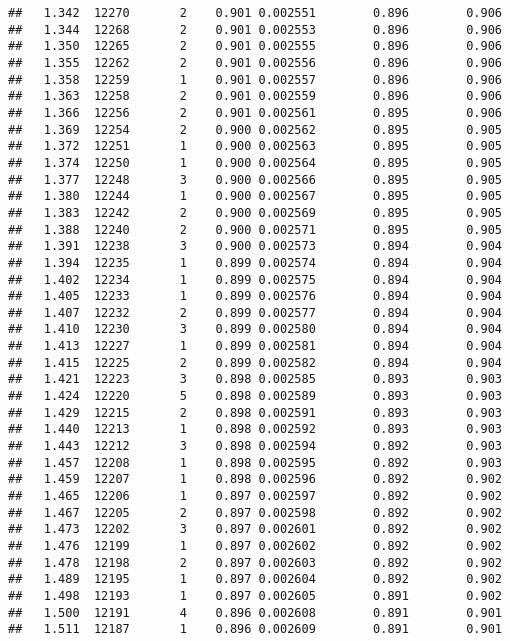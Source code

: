 \documentclass[
]{book}
\begin{document}
\begin{verbatim}
##   1.342  12270       2    0.901 0.002551        0.896        0.906
##   1.344  12268       2    0.901 0.002553        0.896        0.906
##   1.350  12265       2    0.901 0.002555        0.896        0.906
##   1.355  12262       2    0.901 0.002556        0.896        0.906
##   1.358  12259       1    0.901 0.002557        0.896        0.906
##   1.363  12258       2    0.901 0.002559        0.896        0.906
##   1.366  12256       2    0.901 0.002561        0.895        0.906
##   1.369  12254       2    0.900 0.002562        0.895        0.905
##   1.372  12251       1    0.900 0.002563        0.895        0.905
##   1.374  12250       1    0.900 0.002564        0.895        0.905
##   1.377  12248       3    0.900 0.002566        0.895        0.905
##   1.380  12244       1    0.900 0.002567        0.895        0.905
##   1.383  12242       2    0.900 0.002569        0.895        0.905
##   1.388  12240       2    0.900 0.002571        0.895        0.905
##   1.391  12238       3    0.900 0.002573        0.894        0.904
##   1.394  12235       1    0.899 0.002574        0.894        0.904
##   1.402  12234       1    0.899 0.002575        0.894        0.904
##   1.405  12233       1    0.899 0.002576        0.894        0.904
##   1.407  12232       2    0.899 0.002577        0.894        0.904
##   1.410  12230       3    0.899 0.002580        0.894        0.904
##   1.413  12227       1    0.899 0.002581        0.894        0.904
##   1.415  12225       2    0.899 0.002582        0.894        0.904
##   1.421  12223       3    0.898 0.002585        0.893        0.903
##   1.424  12220       5    0.898 0.002589        0.893        0.903
##   1.429  12215       2    0.898 0.002591        0.893        0.903
##   1.440  12213       1    0.898 0.002592        0.893        0.903
##   1.443  12212       3    0.898 0.002594        0.892        0.903
##   1.457  12208       1    0.898 0.002595        0.892        0.903
##   1.459  12207       1    0.898 0.002596        0.892        0.902
##   1.465  12206       1    0.897 0.002597        0.892        0.902
##   1.467  12205       2    0.897 0.002598        0.892        0.902
##   1.473  12202       3    0.897 0.002601        0.892        0.902
##   1.476  12199       1    0.897 0.002602        0.892        0.902
##   1.478  12198       2    0.897 0.002603        0.892        0.902
##   1.489  12195       1    0.897 0.002604        0.892        0.902
##   1.498  12193       1    0.897 0.002605        0.891        0.902
##   1.500  12191       4    0.896 0.002608        0.891        0.901
##   1.511  12187       1    0.896 0.002609        0.891        0.901

\end{verbatim}
\end{document}
